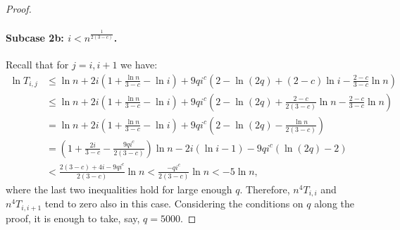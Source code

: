 \documentclass[11pt]{article}
\theoremstyle{definition}
\begin{document}
\begin{proof}
	\paragraph{Subcase 2b: $i < n^{\frac{1}{2(3-c)}}$.} Recall that for $j=i,i+1$ we have:
	\begin{align*} 
		\ln T_{i,j} & \le \ln n + 2i \left(1+\frac{\ln n}{3-c} - \ln i\right) + 9qi^c \left(2-\ln(2q)+(2-c)\ln i - \frac{2-c}{3-c}\ln n\right) \\ 
		& \le \ln n + 2i \left(1+\frac{\ln n}{3-c} - \ln i\right) + 9qi^c \left(2-\ln(2q)+\frac{2-c}{2(3-c)}\ln n - \frac{2-c}{3-c}\ln n\right) \\ 
		& = \ln n + 2i \left(1+\frac{\ln n}{3-c} - \ln i\right) + 9qi^c\left(2- \ln (2q) - \frac{\ln n}{2(3-c)} \right) \\ 
		& = \left(1+ \frac{2i}{3-c} - \frac{9qi^c}{2(3-c)}\right)\ln n 
		-2i(\ln i - 1) - 9qi^c(\ln(2q)-2) \\ 
		& < \frac{2(3-c)+4i-9qi^c}{2(3-c)}  \ln n < \frac{-qi^c}{2(3-c)}\ln n < -5\ln n,
	\end{align*}
	where the last two inequalities hold for large enough $q$.
	Therefore, $n^4 T_{i,i}$ and $n^4 T_{i,i+1}$ tend to zero also in this case.
	Considering the conditions on $q$ along the proof, it is enough to take, say, $q=5000$.
\end{proof}
\end{document}
